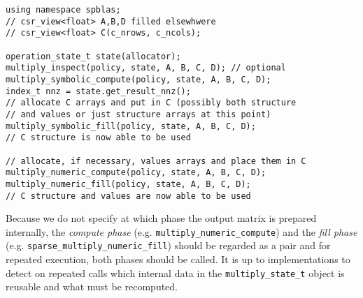 \documentclass{article}
\begin{document}
\begin{verbatim}
using namespace spblas;
// csr_view<float> A,B,D filled elsewhwere
// csr_view<float> C(c_nrows, c_ncols);

operation_state_t state(allocator);
multiply_inspect(policy, state, A, B, C, D); // optional
multiply_symbolic_compute(policy, state, A, B, C, D);
index_t nnz = state.get_result_nnz();
// allocate C arrays and put in C (possibly both structure
// and values or just structure arrays at this point)
multiply_symbolic_fill(policy, state, A, B, C, D);
// C structure is now able to be used

// allocate, if necessary, values arrays and place them in C
multiply_numeric_compute(policy, state, A, B, C, D);
multiply_numeric_fill(policy, state, A, B, C, D);
// C structure and values are now able to be used
\end{verbatim}

Because we do not specify at which phase the output matrix is prepared internally, the \textit{compute phase} (e.g. \texttt{multiply\_numeric\_compute}) and the \textit{fill phase} (e.g. \texttt{sparse\_multiply\_numeric\_fill}) should be regarded as a pair and for repeated execution, both phases should be called.  It is up to implementations to detect on repeated calls which internal data in the \texttt{multiply\_state\_t} object is reusable and what must be recomputed.
\end{document}
